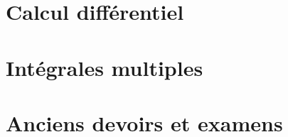 
\section{Calcul différentiel}



\section{Intégrales multiples}


\section{Anciens devoirs et examens}






